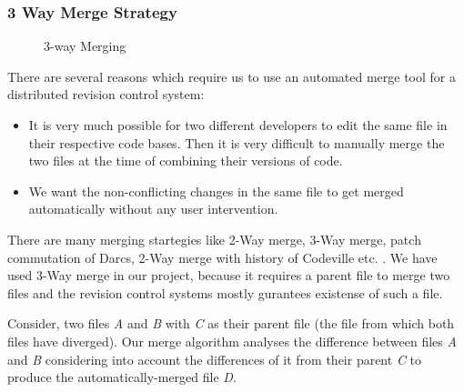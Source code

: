 \documentclass[12pt]{article}
\begin{document}
\subsubsection{3 Way  Merge Strategy}
\begin{wrapfigure}[6]{r}{6cm}
\centering
{}
\caption{3-way Merging}
\end{wrapfigure}
There are several reasons which require us to use an automated merge tool for
a distributed revision control system:
\begin{itemize}
\item It is very much possible for two different developers to edit the same
  file in their respective code bases. Then it is very difficult to manually
  merge the two files at the time of combining their versions of code.
\item We want the non-conflicting changes in the same file to get merged
  automatically without any user intervention.
\end{itemize}

There are many merging startegies like 2-Way merge, 3-Way merge, patch
commutation of Darcs, 2-Way merge with history of Codeville
etc. \cite{WIKIMERGE}. We have used 3-Way merge in our project, because it
requires a parent file to merge two files and the revision control systems
mostly gurantees existense of such a file.

Consider, two files \emph{A} and \emph{B} with \emph{C} as their parent file
(the file from which both files have diverged). Our merge algorithm analyses
the difference between files \emph{A} and \emph{B} considering into account
the differences of it from their parent \emph{C} to produce the
automatically-merged file \emph{D}.
\end{document}
